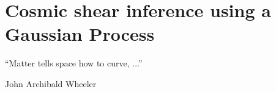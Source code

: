 
\doublespacing
\setcounter{chapter}{3}
\chapter{Cosmic shear inference using a Gaussian Process}{}{}
\label{chapter4}
\epigraph{``Matter tells space how to curve, ...''}{John Archibald Wheeler} 

